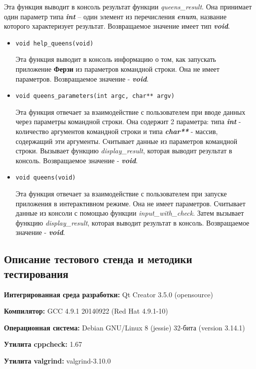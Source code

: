 \documentclass[12pt,a4paper]{report}
\begin{document}
\begin{enumerate}
\begin{itemize}
Эта функция выводит в консоль результат функции \textit{queens\_result}. Она принимает один параметр типа \textit{\textbf{int}} -- один элемент из перечисления \textit{\textbf{enum}}, название которого характеризует результат. Возвращаемое значение имеет тип \textit{\textbf{void}}.
\end{itemize}

\begin{itemize}
\item \verb-void help_queens(void)-

Эта функция выводит в консоль информацию о том, как запускать приложение \textbf{Ферзи} из параметров командной строки. Она не имеет параметров. Возвращаемое значение - \textit{\textbf{void}}.
\end{itemize}

\begin{itemize}
\item \verb-void queens_parameters(int argc, char** argv)-

Эта функция отвечает за взаимодействие с пользователем при вводе данных через параметры командной строки. Она содержит 2 параметра: типа \textbf{\textit{int}} - количество аргументов командной строки и типа \textbf{\textit{char**}} - массив, содержащий эти аргументы. Считывает данные из параметров командной строки. Вызывает функцию \textit{display\_result}, которая выводит результат в консоль. Возвращаемое значение - \textit{\textbf{void}}.
\end{itemize}

\begin{itemize}
\item \verb-void queens(void)-

Эта функция отвечает за взаимодействие с пользователем при запуске приложения в интерактивном режиме. Она не имеет параметров. Считывает данные из консоли с помощью функции \textit{input\_with\_check}. Затем вызывает функцию %
\textit{display\_result}, которая выводит результат в консоль. Возвращаемое значение - \textit{\textbf{void}}.
\end{itemize}
\end{enumerate}
\subsection{Описание тестового стенда и методики тестирования}

\begin{flushleft}
\textbf{Интегрированная среда разработки:} Qt Creator 3.5.0 (opensource)

\textbf{Компилятор:} GCC 4.9.1 20140922 (Red Hat 4.9.1-10)

\textbf{Операционная система:} Debian GNU/Linux 8 (jessie) 32-бита (version 3.14.1)

\textbf{Утилита cppcheck:} 1.67

\textbf{Утилита valgrind:} valgrind-3.10.0
\end{flushleft}
\end{document}
